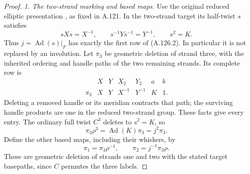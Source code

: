 \begin{proof}
\emph{1. The two-strand marking and based maps.}
Use the original reduced elliptic presentation
\citep[\S1.2]{A_Enriquez2014}, as fixed in A.121. In the
two-strand target its half-twist \(s\) satisfies
\[
 sXs=X^{-1},\qquad s^{-1}Ys^{-1}=Y^{-1},\qquad s^2=K.
\]
Thus \(j=\operatorname{Ad}(s)|_F\) has exactly the first row of
(A.126.2). In particular it is not replaced by an involution.
Let \(\pi_3\) be geometric deletion of strand three, with the
inherited ordering and handle paths of the two remaining strands.
Its complete row is
\[
\begin{array}{c|rrrrrr}
 &X&Y&X_2&Y_2&a&b\\ \hline
 \pi_3&X&Y&X^{-1}&Y^{-1}&K&1 .
\end{array}                                                  \tag{A.126.5}
\]
Deleting a removed handle or its meridian contracts that path;
the surviving handle products are one in the reduced two-strand
group. These facts give every entry. The ordinary full twist
\(C^3\) deletes to \(s^2=K\), so
\[
          \pi_3\rho^3=\operatorname{Ad}(K)\pi_3=j^2\pi_3.
                                                                  \tag{A.126.6}
\]
Define the other based maps, including their whiskers, by
\[
             \pi_1=\pi_3\rho^{-1},\qquad
             \pi_2=j^{-1}\pi_3\rho.                           \tag{A.126.7}
\]
These are geometric deletion of strands one and two with the
stated target basepaths, since \(C\) permutes the three labels.


\end{proof}
